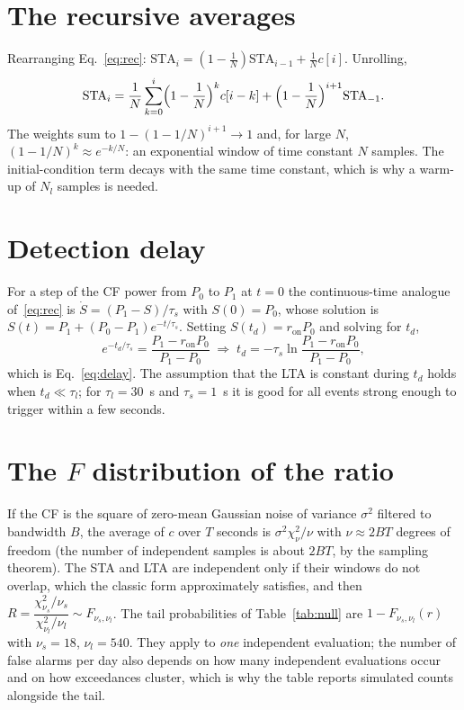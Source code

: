 \section{The recursive averages}\label{app:rec}
Rearranging Eq.~\eqref{eq:rec}: $\mathrm{STA}_i=(1-\tfrac1N)\mathrm{STA}_{i-1}+\tfrac1N c[i]$. Unrolling,
\begin{equation}
  \mathrm{STA}_i = \frac1N\sum_{k=0}^{i}\Bigl(1-\frac1N\Bigr)^{k}c[i-k]+\Bigl(1-\frac1N\Bigr)^{i+1}\mathrm{STA}_{-1}.
\end{equation}
The weights sum to $1-(1-1/N)^{i+1}\to1$ and, for large $N$, $(1-1/N)^{k}\approx e^{-k/N}$: an exponential window of time
constant $N$ samples. The initial-condition term decays with the same time constant, which is why a warm-up of $N_l$ samples is
needed.

\section{Detection delay}\label{app:delay}
For a step of the CF power from $P_0$ to $P_1$ at $t=0$ the continuous-time analogue of~\eqref{eq:rec} is
$\dot{S}=(P_1-S)/\tau_s$ with $S(0)=P_0$, whose solution is $S(t)=P_1+(P_0-P_1)e^{-t/\tau_s}$. Setting
$S(t_d)=r_{\mathrm{on}}P_0$ and solving for $t_d$,
\[
  e^{-t_d/\tau_s}=\frac{P_1-r_{\mathrm{on}}P_0}{P_1-P_0}
  \;\Rightarrow\;
  t_d=-\tau_s\ln\frac{P_1-r_{\mathrm{on}}P_0}{P_1-P_0},
\]
which is Eq.~\eqref{eq:delay}. The assumption that the LTA is constant during $t_d$ holds when $t_d\ll\tau_l$; for $\tau_l=30$~s and
$\tau_s=1$~s it is good for all events strong enough to trigger within a few seconds.

\section{The $F$ distribution of the ratio}\label{app:f}
If the CF is the square of zero-mean Gaussian noise of variance $\sigma^{2}$ filtered to bandwidth $B$, the average of $c$ over $T$ seconds is
$\sigma^{2}\chi^{2}_{\nu}/\nu$ with $\nu\approx2BT$ degrees of freedom (the number of independent samples is about $2BT$, by the
sampling theorem). The STA and LTA are independent only if their windows do not overlap, which the classic form approximately
satisfies, and then $R=\dfrac{\chi^{2}_{\nu_s}/\nu_s}{\chi^{2}_{\nu_l}/\nu_l}\sim F_{\nu_s,\nu_l}$. The tail probabilities of
Table~\ref{tab:null} are $1-F_{\nu_s,\nu_l}(r)$ with $\nu_s=18$, $\nu_l=540$. They apply to \emph{one} independent evaluation;
the number of false alarms per day also depends on how many independent evaluations occur and on how exceedances cluster,
which is why the table reports simulated counts alongside the tail.

